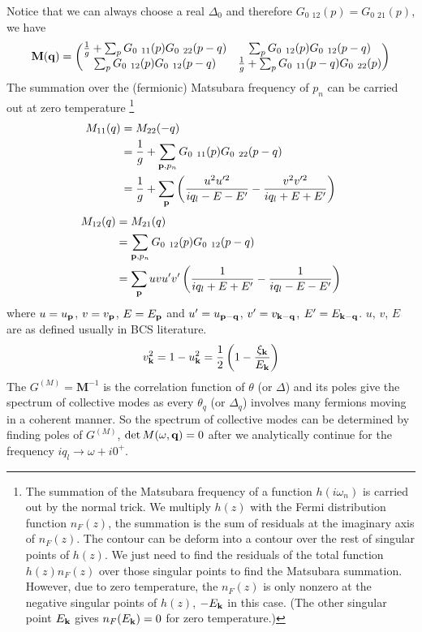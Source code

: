 Notice that we can always choose a real $\Delta_{0}$ and therefore $G_{0}{\ _{12}}(p)=G_{0}{\ _{21}}(p)$, we have 
\begin{equation}
\mathbf{M(q)}=
\begin{pmatrix}
\nth{g}+\sum_{p}G_{0}{\ }_{11}(p)G_{0}{\ }_{22}(p-q)&\sum_{p}G_{0}{\ }_{12}(p)G_{0}{\ }_{12}(p-q)\\
\sum_{p}G_{0}{\ }_{12}(p)G_{0}{\ }_{12}(p-q)&\nth{g}+\sum_{p}G_{0}{\ }_{11}(p-q)G_{0}{\ }_{22}(p)
\end{pmatrix}
\end{equation}
The summation over  the (fermionic) Matsubara frequency of $p_{n}$ can be carried out at zero temperature
\footnote{\label{foot:intro:sum}The summation of the Matsubara frequency of a function $h(i\omega_{n})$ is carried out by the normal trick.  We  multiply $h(z)$ with the Fermi distribution function $n_{F}(z)$,  the summation is the sum of residuals at the imaginary axis of $n_{F}(z)$.  The contour can be deform into a contour over the rest of singular points of $h(z)$. We just need to find the residuals of the total function $h(z)n_{F}(z)$ over those singular points to find the Matsubara summation.   However, due to zero temperature, the  $n_{F}(z)$ is only nonzero at the negative singular points of $h(z)$, $-E_{\mathbf{k}}$ in this case.  (The other singular point $E_{\mathbf{k}}$ gives $n_{F}(E_{\mathbf{k}})=0$ for zero temperature.)}
\begin{equation}
\begin{split}
M_{11}(q)&=M_{22}(-q)\\
	&=\nth{g}+\sum_{\vp{,}p_{n}}G_{0}{\ }_{11}(p)G_{0}{\ }_{22}(p-q)\\
	&=\nth{g}+\sum_{\vp}\br{\frac{u^{2}u'^{2}}{iq_{l}-E-E'}-\frac{v^{2}v'^{2}}{iq_{l}+E+E'}}
\end{split}
\end{equation}
\begin{equation}
\begin{split}
M_{12}(q)&=M_{21}(q)\\
	&=\sum_{\mathbf{p}{,}p_{n}}G_{0}{\ }_{12}(p)G_{0}{\ }_{12}(p-q)\\
	&=\sum_{\mathbf{p}}uvu'v'\left(\frac{1}{iq_{l}+E+E'}-\frac{1}{iq_{l}-E-E'}\right)
\end{split}
\end{equation}
where $u=u_{\mathbf{p}}$, $v=v_{\mathbf{p}}$, $E=E_{\mathbf{p}}$ and $u'=u_{\mathbf{p}-\mathbf{q}}$, $v'=v_{\mathbf{k}-\mathbf{q}}$, $E'=E_{\mathbf{k}-\mathbf{q}}$.  $u$, $v$, $E$ are as defined usually in BCS literature. 
\begin{equation}
v_{\mathbf{k}}^{2}=1-u_{\mathbf{k}}^{2}=\frac{1}{2}\left(1-\frac{\xi_{\mathbf{k}}}{E_{\mathbf{k}}}\right)
\end{equation}
 The $G^{(M)}=\mathbf{M}^{-1}$ is the correlation function of $\theta$ (or $\Delta$) and its poles give the spectrum of collective modes as every  $\theta_{q}$ (or $\Delta_{q}$) involves many fermions moving in a coherent manner.  So the spectrum of collective modes can be determined by finding poles of $G^{(M)}$, $\det{M(\omega,\ensuremath{\mathbf{q}})}=0$ after we analytically continue for the frequency $iq_{l}\rightarrow\omega+i0^{+}$.  
 
